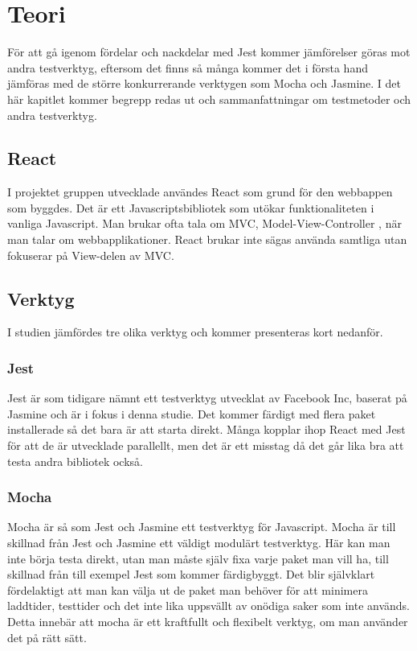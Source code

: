 \section{Teori}
\label{sec:david-theory}
För att gå igenom fördelar och nackdelar med Jest kommer jämförelser göras mot andra testverktyg, eftersom det finns så många kommer det i första hand jämföras med de större konkurrerande verktygen \cite{bib-test-tools} som Mocha och Jasmine. I det här kapitlet kommer begrepp redas ut och sammanfattningar om testmetoder och andra testverktyg.


\subsection{React}
I projektet gruppen utvecklade användes React som grund för den webbappen som byggdes. Det är ett Javascriptsbibliotek som utökar funktionaliteten i vanliga Javascript. Man brukar ofta tala om MVC, Model-View-Controller \cite{bib-mvc}, när man talar om webbapplikationer. React brukar inte sägas använda samtliga utan fokuserar på View-delen av MVC.

\subsection{Verktyg}
I studien jämfördes tre olika verktyg och kommer presenteras kort nedanför.

\subsubsection{Jest}
Jest är som tidigare nämnt ett testverktyg utvecklat av Facebook Inc, baserat på Jasmine och är i fokus i denna studie. Det kommer färdigt med flera paket installerade så det bara är att starta direkt. Många kopplar ihop React med Jest för att de är utvecklade parallellt, men det är ett misstag då det går lika bra att testa andra bibliotek också.

\subsubsection{Mocha}
Mocha är så som Jest och Jasmine ett testverktyg för Javascript. Mocha är till skillnad från Jest och Jasmine ett väldigt modulärt testverktyg. Här kan man inte börja testa direkt, utan man måste själv fixa varje paket man vill ha, till skillnad från till exempel Jest som kommer färdigbyggt. Det blir självklart fördelaktigt att man kan välja ut de paket man behöver för att minimera laddtider, testtider och det inte lika uppsvällt av onödiga saker som inte används. Detta innebär att mocha är ett kraftfullt och flexibelt verktyg, om man använder det på rätt sätt.

